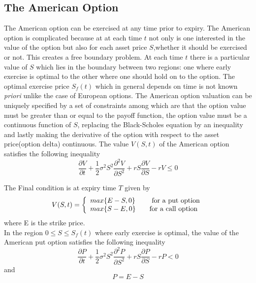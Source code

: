 \documentclass[12pt]{article}
\numberwithin{equation}{subsection} %
\begin{document}

\subsection{The American Option}
The American option can be exercised at any time prior to expiry.
The American option is complicated because at at each time $t$ not
only is one interested in the value of the option but also for each
asset price $S$,whether it should be exercised or not. This creates
a free boundary problem\cite{Wilmot}. At each time $t$ there is a
particular value of $S$ which lies in the boundary between two
regions: one where early exercise is optimal to the other where one
should hold on to the option. The optimal exercise price $S_{f}(t)$
which in general depends on time is not known \textit{priori} unlike
the case of European options. The American option valuation can be
uniquely specified by a set of constraints among which are that the
option value must be greater than or equal to the payoff function,
the option value must be a continuous function of $S$, replacing the
Black-Scholes equation by an inequality and lastly making the
derivative of the option with respect to the asset price(option
delta) continuous.
 The value $V(S,t)$ of the American option satisfies the following
 inequality
 \begin{equation}
\frac{\partial V}{\partial t}+\frac{1}{2}\sigma^2S^2\frac{\partial^2
V}{\partial S^2} +rS\frac{\partial V}{\partial S}-rV\leq 0
 \end{equation}

The Final condition is at expiry time $T$ given by\cite{Wilmot}
\[V(S,t) = \left\{
\begin{array}{l l}\label{FNC}
  max\{E-S,0\} & \quad \mbox{ for a put option}\\
  max\{S-E,0\}& \quad \mbox{for a call option}\\ \end{array} \right. \]
  where E is the strike price.\\
  In the region $0\leq S\leq S_{f}(t)$ where early exercise is optimal, the value of the
  American put option satisfies the following inequality
 \begin{equation}
\frac{\partial P}{\partial t}+\frac{1}{2}\sigma^2S^2\frac{\partial^2
P}{\partial S^2} +rS\frac{\partial P}{\partial S}-rP< 0
 \end{equation}
 and
  \begin{equation}
P=E-S
 \end{equation}
\end{document}
